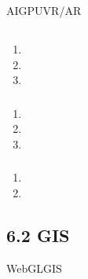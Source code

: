 AIGPUVR/AR

\hypertarget{section-45}{%
\subsection{}\label{section-45}}

\hypertarget{section-46}{%
\subsubsection{}\label{section-46}}

\begin{enumerate}
\def\labelenumi{\arabic{enumi}.}
\tightlist
\item
\item
\item
\end{enumerate}

\hypertarget{section-47}{%
\subsubsection{}\label{section-47}}

\begin{enumerate}
\def\labelenumi{\arabic{enumi}.}
\tightlist
\item
\item
\item
\end{enumerate}

\hypertarget{section-48}{%
\subsubsection{}\label{section-48}}

\begin{enumerate}
\def\labelenumi{\arabic{enumi}.}
\tightlist
\item
\item
\end{enumerate}

\hypertarget{section-49}{%
\subsection{}\label{section-49}}

\hypertarget{gis}{%
\subsection{6.2 GIS}\label{gis}}

WebGLGIS

